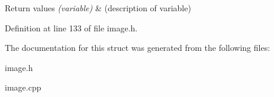 \begin{DoxyRetVals}{Return values}
{\em (variable)} & (description of variable) \\
\hline
\end{DoxyRetVals}


Definition at line 133 of file image.\+h.



The documentation for this struct was generated from the following files\+:\begin{DoxyCompactItemize}
\item 
image.\+h\item 
image.\+cpp\end{DoxyCompactItemize}
